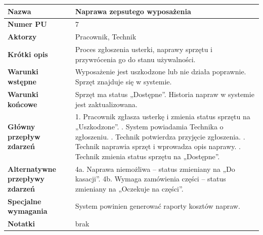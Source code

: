 \documentclass{article}
\begin{document}
    \begin{tabular}{|m{10em}|m{30em}|}
        \hline
        \textbf{Nazwa} & Naprawa zepsutego wyposażenia \\
        \hline
        \textbf{Numer PU} & 7 \\
        \hline
        \textbf{Aktorzy} & Pracownik, Technik \\
        \hline
        \textbf{Krótki opis} & Proces zgłoszenia usterki, naprawy sprzętu i przywrócenia go do stanu używalności. \\
        \hline
        \textbf{Warunki wstępne} & Wyposażenie jest uszkodzone lub nie działa poprawnie. Sprzęt znajduje się w systemie. \\
        \hline
        \textbf{Warunki końcowe} & Sprzęt ma status „Dostępne”. Historia napraw w systemie jest zaktualizowana. \\
        \hline
        \textbf{Główny przepływ zdarzeń} & 
            1. Pracownik zgłasza usterkę i zmienia status sprzętu na „Uszkodzone”. \newline
            2. System powiadamia Technika o zgłoszeniu. \newline
            3. Technik potwierdza przyjęcie zgłoszenia. \newline
            4. Technik naprawia sprzęt i wprowadza opis naprawy. \newline
            5. Technik zmienia status sprzętu na „Dostępne”. \\
        \hline
        \textbf{Alternatywne przepływy zdarzeń} & 
            4a. Naprawa niemożliwa – status zmieniany na „Do kasacji”. \newline
            4b. Wymaga zamówienia części – status zmieniany na „Oczekuje na części”. \\
        \hline
        \textbf{Specjalne wymagania} & System powinien generować raporty kosztów napraw. \\
        \hline
        \textbf{Notatki} & brak \\
        \hline
    \end{tabular}

\vspace{1cm}
\end{document}
